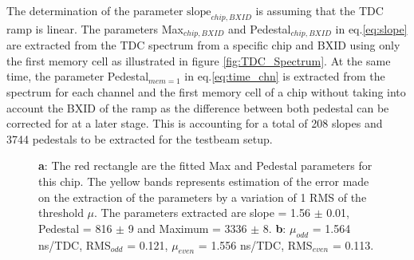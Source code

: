 \documentclass[twoside,a4paper,11pt]{article}
\begin{document}
The determination of the parameter $\text{slope}_{chip, BXID}$ is assuming that the TDC ramp is linear. The parameters Max$_{chip, BXID}$ and Pedestal$_{chip, BXID}$ in eq.\ref{eq:slope} are extracted from the TDC spectrum from a specific chip and BXID using only the first memory cell as illustrated in figure \ref{fig:TDC_Spectrum}. At the same time, the parameter Pedestal$_{mem=1}$ in eq.\ref{eq:time_chn} is extracted from the spectrum for each channel and the first memory cell of a chip without taking into account the BXID of the ramp as the difference between both pedestal can be corrected for at a later stage. This is accounting for a total of 208 slopes and 3744 pedestals to be extracted for the testbeam setup.
\begin{figure}[!htbp]
	\hfill
	\caption[]{\textbf{a}: The red rectangle are the fitted Max and Pedestal parameters for this chip. The yellow bands represents estimation of the error made on the extraction of the parameters by a variation of 1 RMS of the threshold $\mu$. The parameters extracted are slope = 1.56 $\pm$ 0.01, Pedestal = 816 $\pm$ 9 and Maximum = 3336 $\pm$ 8. \textbf{b}: $\mu_{odd}$ = 1.564 ns/TDC, RMS$_{odd}$ = 0.121, $\mu_{even}$ = 1.556 ns/TDC, RMS$_{even}$ = 0.113.}
\end{figure}
\end{document}
